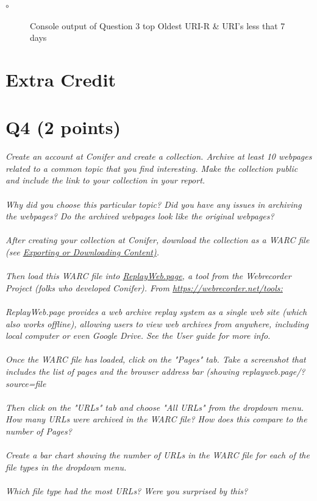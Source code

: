 \documentclass[12pt]{article}
\begin{document}
\begin{itemize}
\begin{list}{$\circ$}
\begin{figure}[H]
                \caption{Console output of Question 3 top Oldest URI-R \& URI's less that 7 days}
                \label{fig:Q3Ans}
            \end{figure}
        \end{list}
\end{itemize}


\section*{Extra Credit}
\section*{Q4 (2 points)}
\emph{Create an account at Conifer and create a collection. Archive at least 10 webpages related to a common topic that you find interesting. Make the collection public and include the link to your collection in your report.
\\ \\
Why did you choose this particular topic? Did you have any issues in archiving the webpages? Do the archived webpages look like the original webpages?
\\ \\
    After creating your collection at Conifer, download the collection as a WARC file (see \href{https://guide.conifer.rhizome.org/docs/manage-sessions/exporting-warc/}{Exporting or Downloading Content)}.
\\ \\
Then load this WARC file into \href{https://replayweb.page/}{ReplayWeb.page}, a tool from the Webrecorder Project (folks who developed Conifer). From \href{https://webrecorder.net/tools}{https://webrecorder.net/tools:}
\\ \\
ReplayWeb.page provides a web archive replay system as a single web site (which also works offline), allowing users to view web archives from anywhere, including local computer or even Google Drive. See the User guide for more info.
\\ \\
Once the WARC file has loaded, click on the "Pages" tab. Take a screenshot that includes the list of pages and the browser address bar (showing replayweb.page/?source=file%
\\ \\
Then click on the "URLs" tab and choose "All URLs" from the dropdown menu. How many URLs were archived in the WARC file? How does this compare to the number of Pages?
\\ \\
Create a bar chart showing the number of URLs in the WARC file for each of the file types in the dropdown menu.
\\ \\
Which file type had the most URLs? Were you surprised by this?}
\end{document}
